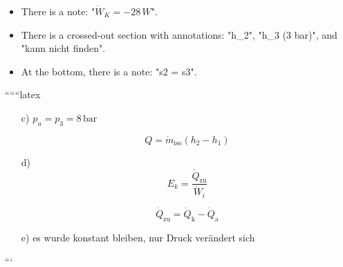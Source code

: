 \begin{itemize}
    \item There is a note: "\(\dot{W}_{K} = -28 \, W\)".
    \item There is a crossed-out section with annotations: "h_{2}", "h_{3} (3 bar)", and "kann nicht finden".
    \item At the bottom, there is a note: "s2 = s3".
\end{itemize}

``````latex


\begin{itemize}
    \item[c)] \( p_u = p_3 = 8 \, \text{bar} \)
    
    \[
    Q = \dot{m}_{\text{iso}} (h_2 - h_1)
    \]
    
    \item[d)] 
    \[
    E_k = \frac{\dot{Q}_{\text{zu}}}{\dot{W}_i}
    \]
    
    \[
    \dot{Q}_{\text{zu}} = \dot{Q}_{\text{k}} - \dot{Q}_{\text{a}}
    \]
    
    \item[e)] es wurde konstant bleiben, nur Druck verändert sich
\end{itemize}

```